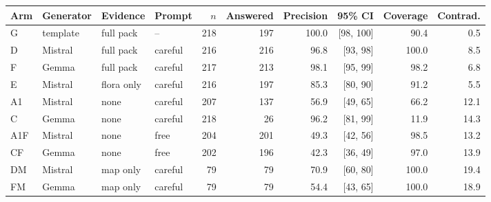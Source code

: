 \begin{tabular}{llllrrrrrr}
\toprule
Arm & Generator & Evidence & Prompt & $n$ & Answered & Precision & 95\% CI & Coverage & Contrad. \\
\midrule
G & template & full pack & -- & 218 & 197 & 100.0 & [98, 100] & 90.4 & 0.5 \\
D & Mistral & full pack & careful & 216 & 216 & 96.8 & [93, 98] & 100.0 & 8.5 \\
F & Gemma & full pack & careful & 217 & 213 & 98.1 & [95, 99] & 98.2 & 6.8 \\
E & Mistral & flora only & careful & 216 & 197 & 85.3 & [80, 90] & 91.2 & 5.5 \\
A1 & Mistral & none & careful & 207 & 137 & 56.9 & [49, 65] & 66.2 & 12.1 \\
C & Gemma & none & careful & 218 & 26 & 96.2 & [81, 99] & 11.9 & 14.3 \\
A1F & Mistral & none & free & 204 & 201 & 49.3 & [42, 56] & 98.5 & 13.2 \\
CF & Gemma & none & free & 202 & 196 & 42.3 & [36, 49] & 97.0 & 13.9 \\
DM & Mistral & map only & careful & 79 & 79 & 70.9 & [60, 80] & 100.0 & 19.4 \\
FM & Gemma & map only & careful & 79 & 79 & 54.4 & [43, 65] & 100.0 & 18.9 \\
\bottomrule
\end{tabular}
